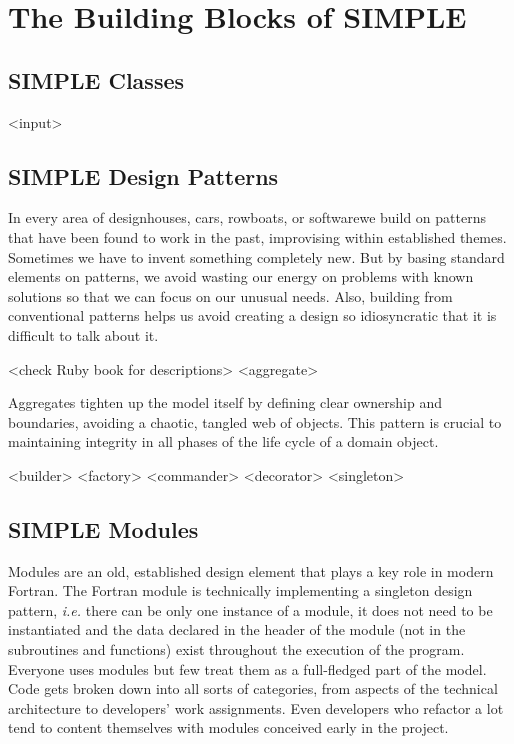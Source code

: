 \documentclass[a4paper,11pt]{article}
\begin{document}
\section{The Building Blocks of SIMPLE}

\subsection{SIMPLE Classes}
<input>

\subsection{SIMPLE Design Patterns}
In every area of design\textemdash{}houses, cars, rowboats, or software\textemdash{}we build on patterns that have been found to work in the past, improvising within established themes. Sometimes we have to invent something completely new. But by basing standard elements on patterns, we avoid wasting our energy on problems with known solutions so that we can focus on our unusual needs. Also, building from conventional patterns helps us avoid creating a design so idiosyncratic that it is difficult to talk about it.

<check Ruby book for descriptions>
<aggregate>

Aggregates tighten up the model itself by defining clear ownership and boundaries, avoiding a chaotic, tangled web of objects. This pattern is crucial to maintaining integrity in all phases of the life cycle of a domain object. 

<builder>
<factory>
<commander>
<decorator>
<singleton>
 
\subsection{SIMPLE Modules}
Modules are an old, established design element that plays a key role in modern Fortran. The Fortran module is technically implementing a singleton design pattern, \textit{i.e.} there can be only one instance of a module, it does not need to be instantiated and the data declared in the header of the module (not in the subroutines and functions) exist throughout the execution of the program. Everyone uses modules but few treat them as a full-fledged part of the model. Code gets broken down into all sorts of categories, from aspects of the technical architecture to developers' work assignments. Even developers who refactor a lot tend to content themselves with modules conceived early in the project.
\end{document}
